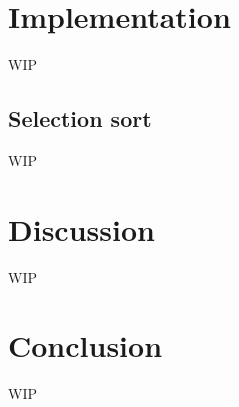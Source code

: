 \section{Implementation}
WIP

\subsection{Selection sort}
WIP


\section{Discussion}
WIP

\section{Conclusion}
WIP



%


%



